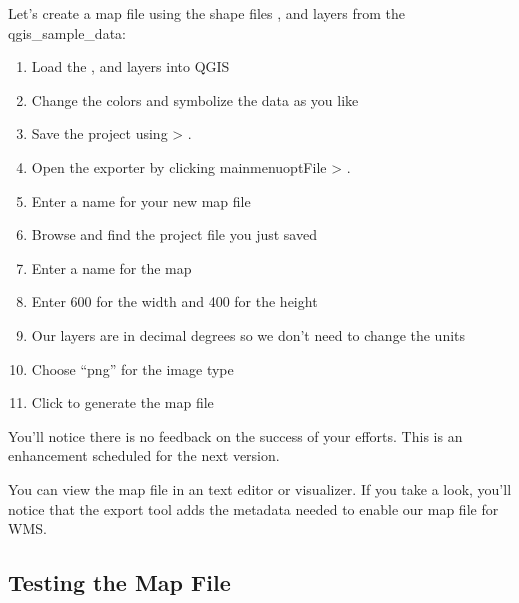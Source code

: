 
Let's create a map file using the shape files ,  
and  layers from the qgis\_sample\_data:

\begin{enumerate}
  \item Load the ,  and  
  layers into QGIS
  \item Change the colors and symbolize the data as you like
  \item Save the project using  >
  .
  \item Open the exporter by clicking mainmenuopt{File} > .
  \item Enter a name for your new map file
  \item Browse and find the project file you just saved
  \item Enter a name for the map
  \item Enter 600 for the width and 400 for the height
  \item Our layers are in decimal degrees so we don't need to change the
    units
  \item Choose ``png'' for the image type
  \item Click  to generate the map file
\end{enumerate}



You'll notice there is no feedback on the success of your efforts. This
is an enhancement scheduled for the next version. 

You can view the map file in an text editor or visualizer. If you
take a look, you'll notice that the export tool adds the metadata needed
to enable our map file for WMS. 

\subsection{Testing the Map File}

